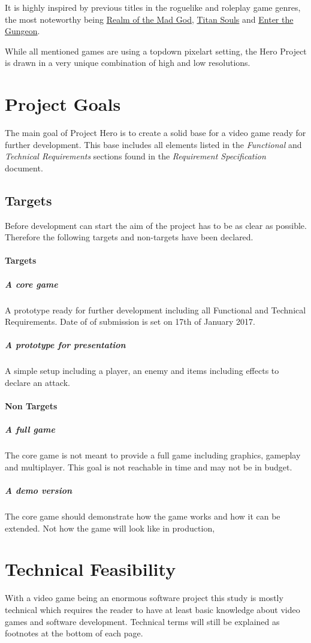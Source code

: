 \documentclass[11pt]{article}
\begin{document}
It is highly inspired by previous titles in the roguelike and roleplay game genres, the most noteworthy being \href{https://realmofthemadgod.com}{Realm of the Mad God}, \href{http://www.devolverdigital.com/games/view/titan-souls}{Titan Souls} and \href{http://dodgeroll.com/gungeon/}{Enter the Gungeon}.

While all mentioned games are using a topdown pixelart setting, the Hero Project is drawn in a very unique combination of high and low resolutions.

\newpage

\section{Project Goals}
The main goal of Project Hero is to create a solid base for a video game ready for further development.
This base includes all elements listed in the \textit{Functional} and \textit{Technical Requirements} sections found in the \textit{Requirement Specification} document.

\subsection{Targets}
Before development can start the aim of the project has to be as clear as possible. Therefore the following targets and non-targets have been declared.
\paragraph{Targets}
\subparagraph{A core game} A prototype ready for further development including all Functional and Technical Requirements. Date of of submission is set on 17th of January 2017.
\subparagraph{A prototype for presentation} A simple setup including a player, an enemy and items including effects to declare an attack.

\paragraph{Non Targets}
\subparagraph{A full game} The core game is not meant to provide a full game including graphics, gameplay and multiplayer. This goal is not reachable in time and may not be in budget.
\subparagraph{A demo version} The core game should demonstrate how the game works and how it can be extended. Not how the game will look like in production,

\newpage

\section{Technical Feasibility}
With a video game being an enormous software project this study is mostly technical which requires the reader to have at least basic knowledge about video games and software development.
Technical terms will still be explained as footnotes at the bottom of each page.
\end{document}
